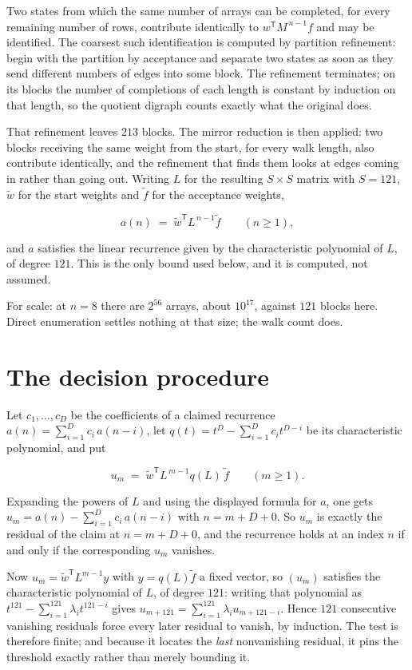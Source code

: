 \documentclass[11pt]{article}
\theoremstyle{definition}
\begin{document}
Two states from which the same number of arrays can be completed, for every remaining number of rows, contribute identically to $w^{\mathsf T}M^{\,n-1}f$ and may be identified. The coarsest such identification is computed by partition refinement: begin with the partition by acceptance and separate two states as soon as they send different numbers of edges into some block. The refinement terminates; on its blocks the number of completions of each length is constant by induction on that length, so the quotient digraph counts exactly what the original does.

That refinement leaves $213$ blocks. The mirror reduction is then applied: two blocks receiving the same weight from the start, for every walk length, also contribute identically, and the refinement that finds them looks at edges coming in rather than going out. Writing $L$ for the resulting $S \times S$ matrix with $S = 121$, $\tilde w$ for the start weights and $\tilde f$ for the acceptance weights,

\[a(n) \;=\; \tilde w^{\mathsf T} L^{\,n-1} \tilde f \qquad (n \ge 1),\]

and $a$ satisfies the linear recurrence given by the characteristic polynomial of $L$, of degree $121$. This is the only bound used below, and it is computed, not assumed.

For scale: at $n = 8$ there are $2^{56}$ arrays, about $10^{17}$, against $121$ blocks here. Direct enumeration settles nothing at that size; the walk count does.

\section{The decision procedure}

Let $c_1,\dots,c_D$ be the coefficients of a claimed recurrence $a(n) = \sum_{i=1}^{D} c_i\,a(n-i)$, let $q(t) = t^{D} - \sum_{i=1}^{D} c_i t^{D-i}$ be its characteristic polynomial, and put

\[u_m \;=\; \tilde w^{\mathsf T} L^{\,m-1} q(L)\,\tilde f \qquad (m \ge 1).\]

Expanding the powers of $L$ and using the displayed formula for $a$, one gets $u_m = a(n) - \sum_{i=1}^{D} c_i\,a(n-i)$ with $n = m + D + 0$. So $u_m$ is exactly the residual of the claim at $n = m + D + 0$, and the recurrence holds at an index $n$ if and only if the corresponding $u_m$ vanishes.

Now $u_m = \tilde w^{\mathsf T} L^{m-1} y$ with $y = q(L)\tilde f$ a fixed vector, so $(u_m)$ satisfies the characteristic polynomial of $L$, of degree $121$: writing that polynomial as $t^{121} - \sum_{i=1}^{121} \lambda_i t^{121-i}$ gives $u_{m+121} = \sum_{i=1}^{121} \lambda_i u_{m+121-i}$. Hence $121$ consecutive vanishing residuals force every later residual to vanish, by induction. The test is therefore finite; and because it locates the {\itshape last} nonvanishing residual, it pins the threshold exactly rather than merely bounding it.
\end{document}
